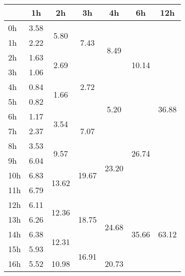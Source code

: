 \begin{center}
\begin{tabular}{| l || c | c | c | c | c | c |}\hline
 & 1h & 2h & 3h & 4h & 6h & 12h \\\hline
0h & \multirow{1}{*}{ 3.58 }  & \multirow{2}{*}{ 5.80 }  & \multirow{3}{*}{ 7.43 }  & \multirow{4}{*}{ 8.49 }  & \multirow{6}{*}{ 10.14 }  & \multirow{12}{*}{ 36.88 }  \\\cline{2-2}
1h & \multirow{1}{*}{ 2.22 }  & & & & & \\\cline{2-2}\cline{3-3}
2h & \multirow{1}{*}{ 1.63 }  & \multirow{2}{*}{ 2.69 }  & & & & \\\cline{2-2}\cline{4-4}
3h & \multirow{1}{*}{ 1.06 }  & & \multirow{3}{*}{ 2.72 }  & & & \\\cline{2-2}\cline{3-3}\cline{5-5}
4h & \multirow{1}{*}{ 0.84 }  & \multirow{2}{*}{ 1.66 }  & & \multirow{4}{*}{ 5.20 }  & & \\\cline{2-2}
5h & \multirow{1}{*}{ 0.82 }  & & & & & \\\cline{2-2}\cline{3-3}\cline{4-4}\cline{6-6}
6h & \multirow{1}{*}{ 1.17 }  & \multirow{2}{*}{ 3.54 }  & \multirow{3}{*}{ 7.07 }  & & \multirow{6}{*}{ 26.74 }  & \\\cline{2-2}
7h & \multirow{1}{*}{ 2.37 }  & & & & & \\\cline{2-2}\cline{3-3}\cline{5-5}
8h & \multirow{1}{*}{ 3.53 }  & \multirow{2}{*}{ 9.57 }  & & \multirow{4}{*}{ 23.20 }  & & \\\cline{2-2}\cline{4-4}
9h & \multirow{1}{*}{ 6.04 }  & & \multirow{3}{*}{ 19.67 }  & & & \\\cline{2-2}\cline{3-3}
10h & \multirow{1}{*}{ 6.83 }  & \multirow{2}{*}{ 13.62 }  & & & & \\\cline{2-2}
11h & \multirow{1}{*}{ 6.79 }  & & & & & \\\cline{2-2}\cline{3-3}\cline{4-4}\cline{5-5}\cline{6-6}\cline{7-7}
12h & \multirow{1}{*}{ 6.11 }  & \multirow{2}{*}{ 12.36 }  & \multirow{3}{*}{ 18.75 }  & \multirow{4}{*}{ 24.68 }  & \multirow{6}{*}{ 35.66 }  & \multirow{12}{*}{ 63.12 }  \\\cline{2-2}
13h & \multirow{1}{*}{ 6.26 }  & & & & & \\\cline{2-2}\cline{3-3}
14h & \multirow{1}{*}{ 6.38 }  & \multirow{2}{*}{ 12.31 }  & & & & \\\cline{2-2}\cline{4-4}
15h & \multirow{1}{*}{ 5.93 }  & & \multirow{3}{*}{ 16.91 }  & & & \\\cline{2-2}\cline{3-3}\cline{5-5}
16h & \multirow{1}{*}{ 5.52 }  & \multirow{2}{*}{ 10.98 }  & & \multirow{4}{*}{ 20.73 }  & & \\\cline{2-2}

\end{tabular}
\end{center}

